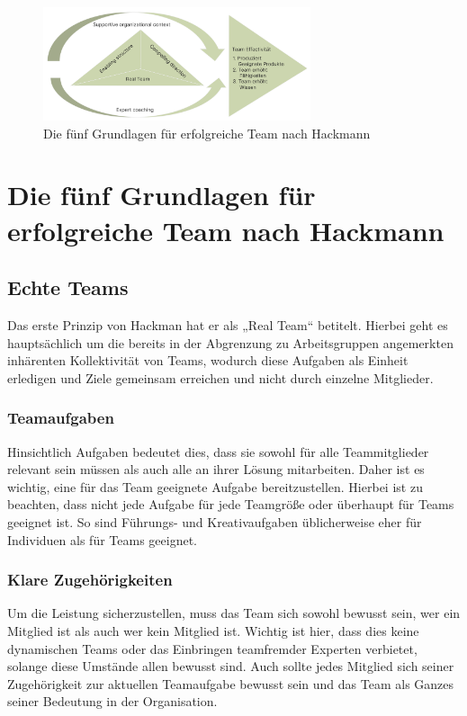 \begin{figure}[bth]
  \centering
  \includegraphics[width=0.7\textwidth]{Examples/Hackman.png}
  \caption{Die fünf Grundlagen für erfolgreiche Team nach Hackmann}
  \label{fig:Hackmann}
\end{figure}


\chapter{Die fünf Grundlagen für erfolgreiche Team nach Hackmann}
\section{Echte Teams}
Das erste Prinzip von Hackman hat er als „Real Team“ betitelt. Hierbei geht es hauptsächlich um die bereits in der Abgrenzung zu Arbeitsgruppen angemerkten inhärenten Kollektivität von Teams, wodurch diese Aufgaben als Einheit erledigen und Ziele gemeinsam erreichen und nicht durch einzelne Mitglieder.
\subsection{Teamaufgaben}
Hinsichtlich Aufgaben bedeutet dies, dass sie sowohl für alle Teammitglieder relevant sein müssen als auch alle an ihrer Lösung mitarbeiten. Daher ist es wichtig, eine für das Team geeignete Aufgabe bereitzustellen. Hierbei ist zu beachten, dass nicht jede Aufgabe für jede Teamgröße oder überhaupt für Teams geeignet ist. So sind Führungs- und Kreativaufgaben üblicherweise eher für Individuen als für Teams geeignet.
\subsection{Klare Zugehörigkeiten}
Um die Leistung sicherzustellen, muss das Team sich sowohl bewusst sein, wer ein Mitglied ist als auch wer kein Mitglied ist. Wichtig ist hier, dass dies keine dynamischen Teams oder das Einbringen teamfremder Experten verbietet, solange diese Umstände allen bewusst sind. Auch sollte jedes Mitglied sich seiner Zugehörigkeit zur aktuellen Teamaufgabe bewusst sein und das Team als Ganzes seiner Bedeutung in der Organisation.
